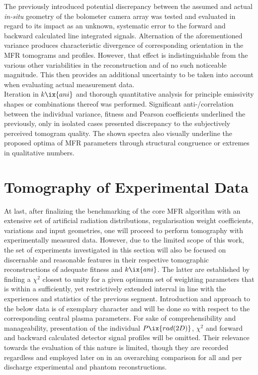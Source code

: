                 The previously introduced potential discrepancy between the assumed and actual \textit{in-situ} geometry of the bolometer camera array was tested and evaluated in regard to its impact as an unknown, systematic error to the forward and backward calculated line integrated signals. Alternation of the aforementioned variance produces characteristic divergence of corresponding orientation in the MFR tomograms and profiles. However, that effect is indistinguishable from the various other variabilities in the reconstruction and of no such noticeable magnitude. This then provides an additional uncertainty to be taken into account when evaluating actual measurement data.\\%
                Iteration in $k\ix{ani}$ and thorough quantitative analysis for principle emissivity shapes or combinations thereof was performed. Significant anti-/correlation between the individual variance, fitness and Pearson coefficients underlined the previously, only in isolated cases presented discrepancy to the subjectively perceived tomogram quality. The shown spectra also visually underline the proposed optima of MFR parameters through structural congruence or extremes in qualitative numbers.%
%
    \section{Tomography of Experimental Data}\label{sec:expdata}%
%
        At last, after finalizing the benchmarking of the core MFR algorithm with an extensive set of artificial radiation distributions, regularisation weight coefficients, variations and input geometries, one will proceed to perform tomography with experimentally measured data. However, due to the limited scope of this work, the set of experiments investigated in this section will also be focused on discernable and reasonable features in their respective tomographic reconstructions of adequate fitness and $k\ix{ani}$. The latter are established by finding a $\chi^{2}$ closest to unity for a given optimum set of weighting parameters that is within a sufficiently, yet restrictively extended interval in line with the experiences and statistics of the previous segment. Introduction and approach to the below data is of exemplary character and will be done so with respect to the corresponding central plasma parameters. For sake of comprehensibility and manageability, presentation of the individual $P\ix{rad(2D)}$, $\chi^{2}$ and forward and backward calculated detector signal profiles will be omitted. Their relevance towards the evaluation of this nature is limited, though they are recorded regardless and employed later on in an overarching comparison for all and per discharge experimental and phantom reconstructions.%
%
